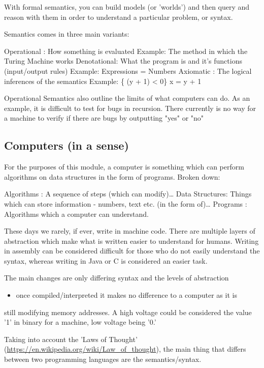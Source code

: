 \documentclass[12pt]{article}
\begin{document}
With formal semantics, you can build models (or 'worlds') and then query and
reason with them in order to understand a particular problem, or syntax.

Semantics comes in three main variants:

Operational : How something is evaluated
              Example: The method in which the Turing Machine works
Denotational: What the program is and it's functions (input/output rules)
              Example: Expressions = Numbers
Axiomatic   : The logical inferences of the semantics
              Example: \{ (y + 1) < 0\} x = y + 1

Operational Semantics also outline the limits of what computers can do.  As an
example, it is difficult to test for bugs in recursion.  There currently is no
way for a machine to verify if there are bugs by outputting "yes" or "no"

\subsection{Computers (in a sense)}
\label{sec-1-4}
For the purposes of this module, a computer is something which can perform
algorithms on data structures in the form of programs.  Broken down:

Algorithms     : A sequence of steps (which can modify)\ldots{}
Data Structures: Things which can store information - numbers, text etc. (in
                 the form of)\ldots{}
Programs       : Algorithms which a computer can understand.

These days we rarely, if ever, write in machine code.  There are multiple
layers of abstraction which make what is written easier to understand for
humans.  Writing in assembly can be considered difficult for those who do not
easily understand the syntax, whereas writing in Java or C is considered an
easier task.

The main changes are only differing syntax and the levels of abstraction
\begin{itemize}
\item once compiled/interpreted it makes no difference to a computer as it is
\end{itemize}
still modifying memory addresses.  A high voltage could be considered the value
'1' in binary for a machine, low voltage being '0.'

Taking into account the 'Laws of Thought'
(\url{https://en.wikipedia.org/wiki/Law_of_thought}), the main thing that differs
between two programming languages are the semantics/syntax.
\end{document}
